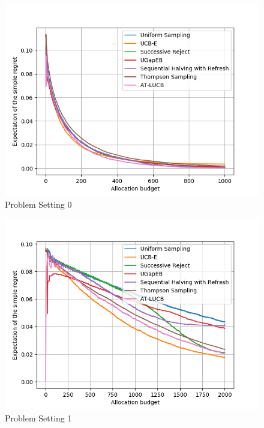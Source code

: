 \documentclass[runningheads,a4paper]{llncs}
\begin{document}
\begin{figure}[ht]
	\centering\includegraphics[width=\textwidth]{../results/ts_mpa/setting0.png}
    	\caption{Problem Setting 0}
	\label{ts_mpa_0}
\end{figure}
\begin{figure}[ht]
    	\centering\includegraphics[width=\textwidth]{../results/ts_mpa/setting1.png}
    	\caption{Problem Setting 1}
	\label{ts_mpa_1}
\end{figure}
\end{document}
